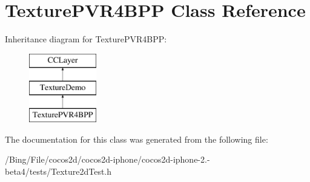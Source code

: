 \hypertarget{interface_texture_p_v_r4_b_p_p}{\section{Texture\-P\-V\-R4\-B\-P\-P Class Reference}
\label{interface_texture_p_v_r4_b_p_p}
}
Inheritance diagram for Texture\-P\-V\-R4\-B\-P\-P\-:\begin{figure}[H]
\begin{center}
\leavevmode
\includegraphics[height=3.000000cm]{interface_texture_p_v_r4_b_p_p}
\end{center}
\end{figure}


The documentation for this class was generated from the following file\-:\begin{DoxyCompactItemize}
\item 
/\-Bing/\-File/cocos2d/cocos2d-\/iphone/cocos2d-\/iphone-\/2.-\/beta4/tests/Texture2d\-Test.\-h\end{DoxyCompactItemize}
